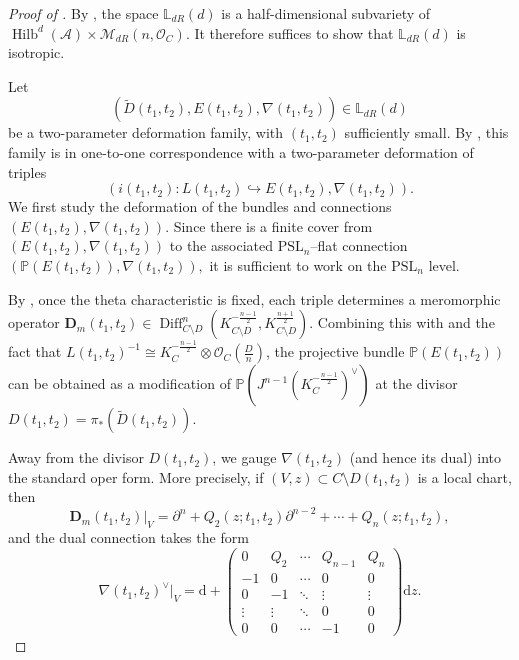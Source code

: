 \documentclass[twoside, 11pt]{article}
\numberwithin{equation}{section}
\theoremstyle{theorem}
\numberwithin{theorem}{section}
\theoremstyle{definition}
\begin{document}
\begin{proof}[Proof of ]
By , the space $\mathbb{L}_{dR}(d)$ is a half-dimensional subvariety of
\(
\operatorname{Hilb}^d(\mathcal A)\times \mathcal{M}_{dR}(n, \mathcal{O}_C).
\)
It therefore suffices to show that $\mathbb{L}_{dR}(d)$ is isotropic.

Let
\[
(\widetilde D(t_1,t_2),E(t_1,t_2),\nabla(t_1,t_2))
\in \mathbb{L}_{dR}(d)
\]
be a two-parameter deformation family, with $(t_1,t_2)$ sufficiently small.
By , this family is in one-to-one correspondence with a two-parameter deformation of triples
\begin{equation}\label{e: two para class dR}
(i(t_1,t_2)\colon L(t_1,t_2)\hookrightarrow E(t_1,t_2),\nabla(t_1,t_2)).
\end{equation}
We first study the deformation of the bundles and connections $(E(t_1,t_2),\nabla(t_1,t_2))$.
Since there is a finite cover from $(E(t_1,t_2),\nabla(t_1,t_2))$ to the associated
$\mathrm{PSL}_n$–flat connection
\(
(\mathbb P(E(t_1,t_2)),\nabla(t_1,t_2)),
\)
it is sufficient to work on the $\mathrm{PSL}_n$ level.

By , once the theta characteristic is fixed, each triple determines a meromorphic operator
\(
\mathbf D_m(t_1,t_2)\in \operatorname{Diff}^n_{C\setminus D} (K_{C\setminus D}^{-\frac{n-1}{2}}, K_{C\setminus D}^{\frac{n+1}{2}}).
\)
Combining this with  and the fact that $L(t_1,t_2)^{-1} \cong K_C^{-\frac{n-1}{2}}\otimes \mathcal{O}_C(\frac{D}{n})$, the projective bundle
$\mathbb P(E(t_1,t_2))$ can be obtained as a modification of $\mathbb P(J^{n-1}(K_C^{-\frac{n-1}{2}})^\vee)$ at the divisor
$D(t_1,t_2)=\pi_*(\widetilde D(t_1,t_2))$.

Away from the divisor $D(t_1,t_2)$, we gauge
$\nabla(t_1,t_2)$ (and hence its dual)
into the standard oper form.
More precisely, if $(V,z) \subset C\setminus D(t_1,t_2)$ is a local chart, then
\[
\mathbf D_m(t_1,t_2)\big|_V
=\partial^n+Q_2(z;t_1,t_2)\partial^{n-2}+\cdots+Q_n(z;t_1,t_2),
\]
and the dual connection takes the form
\begin{equation}\label{e: mero oper form dr lag}
\nabla(t_1,t_2)^{\vee}\big|_V
=\mathrm{d}+
\begin{pmatrix}
 0 & Q_2 & \cdots & Q_{n-1} & Q_{n} \\
 -1 & 0 & \cdots & 0 & 0\\
 0 & -1 & \ddots & \vdots & \vdots\\
 \vdots & \vdots & \ddots & 0 & 0\\
 0 & 0 & \cdots & -1 & 0
\end{pmatrix}\mathrm{d}z.
\end{equation}


\end{proof}
\end{document}
